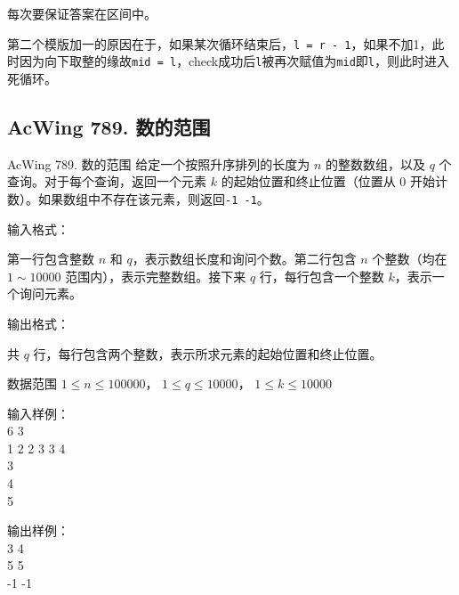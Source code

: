 \begin{keypoint}
    每次要保证答案在区间中。

    第二个模版加一的原因在于，如果某次循环结束后，\lstinline{l = r - 1}，如果不加1，此时因为向下取整的缘故\lstinline{mid = l}，check成功后\lstinline{l}被再次赋值为\lstinline{mid}即\lstinline{l}，则此时进入死循环。
\end{keypoint}

\subsection{AcWing 789. 数的范围}
\begin{titledbox}{AcWing 789. 数的范围}
给定一个按照升序排列的长度为 $n$ 的整数数组，以及 $q$ 个查询。对于每个查询，返回一个元素 $k$ 的起始位置和终止位置（位置从 $0$ 开始计数）。如果数组中不存在该元素，则返回\lstinline{-1 -1}。

输入格式：

第一行包含整数 $n$ 和 $q$，表示数组长度和询问个数。第二行包含 $n$ 个整数（均在 $1 \sim 10000$ 范围内），表示完整数组。接下来 $q$ 行，每行包含一个整数 $k$，表示一个询问元素。

输出格式：

共 $q$ 行，每行包含两个整数，表示所求元素的起始位置和终止位置。

数据范围
$1 \le n \le 100000$，
$1 \le q \le 10000$，
$1 \le k \le 10000$

\begin{minipage}[t]{.5\textwidth}
    输入样例：\\
    6 3 \\
    1 2 2 3 3 4 \\
    3 \\
    4 \\
    5
    \end{minipage}%
    \begin{minipage}[t]{.5\textwidth}
    输出样例：\\
    3 4 \\
    5 5 \\
    -1 -1
\end{minipage}
\end{titledbox}



